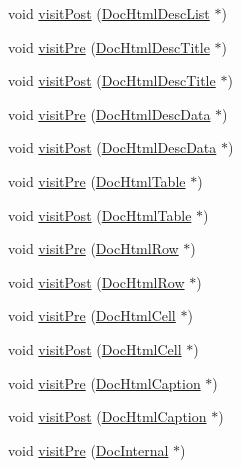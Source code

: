 \begin{DoxyCompactItemize}
\item 
void \hyperlink{class_xml_doc_visitor_acdf145f78058669a7ebdec4b01f5a3d0}{visit\+Post} (\hyperlink{class_doc_html_desc_list}{Doc\+Html\+Desc\+List} $\ast$)
\item 
void \hyperlink{class_xml_doc_visitor_a595c765933227f368988c5b9d9f6caa7}{visit\+Pre} (\hyperlink{class_doc_html_desc_title}{Doc\+Html\+Desc\+Title} $\ast$)
\item 
void \hyperlink{class_xml_doc_visitor_a33e32bde11589abc241522d12605af5d}{visit\+Post} (\hyperlink{class_doc_html_desc_title}{Doc\+Html\+Desc\+Title} $\ast$)
\item 
void \hyperlink{class_xml_doc_visitor_a51bdbe9443903f614f43db7cea6ae737}{visit\+Pre} (\hyperlink{class_doc_html_desc_data}{Doc\+Html\+Desc\+Data} $\ast$)
\item 
void \hyperlink{class_xml_doc_visitor_ae3904008477fa52dff88b6063ff7ef9d}{visit\+Post} (\hyperlink{class_doc_html_desc_data}{Doc\+Html\+Desc\+Data} $\ast$)
\item 
void \hyperlink{class_xml_doc_visitor_aacaefe48d58c04878f7f5463a13f4520}{visit\+Pre} (\hyperlink{class_doc_html_table}{Doc\+Html\+Table} $\ast$)
\item 
void \hyperlink{class_xml_doc_visitor_ac2472360859ba9d911613e7951531060}{visit\+Post} (\hyperlink{class_doc_html_table}{Doc\+Html\+Table} $\ast$)
\item 
void \hyperlink{class_xml_doc_visitor_af1e6260991f61739566f50453e8fa9fd}{visit\+Pre} (\hyperlink{class_doc_html_row}{Doc\+Html\+Row} $\ast$)
\item 
void \hyperlink{class_xml_doc_visitor_a3c2467eba5ee902d4b092168e4887067}{visit\+Post} (\hyperlink{class_doc_html_row}{Doc\+Html\+Row} $\ast$)
\item 
void \hyperlink{class_xml_doc_visitor_ae38f08d399bf68e69f274debcf88c0cd}{visit\+Pre} (\hyperlink{class_doc_html_cell}{Doc\+Html\+Cell} $\ast$)
\item 
void \hyperlink{class_xml_doc_visitor_a5bbdea434f2d4a2c24b27c433d1afea3}{visit\+Post} (\hyperlink{class_doc_html_cell}{Doc\+Html\+Cell} $\ast$)
\item 
void \hyperlink{class_xml_doc_visitor_a31bd42ddaac4b60eb79a1e5e47cb9801}{visit\+Pre} (\hyperlink{class_doc_html_caption}{Doc\+Html\+Caption} $\ast$)
\item 
void \hyperlink{class_xml_doc_visitor_ab5aad7c55a6253e9e606627f4dca1826}{visit\+Post} (\hyperlink{class_doc_html_caption}{Doc\+Html\+Caption} $\ast$)
\item 
void \hyperlink{class_xml_doc_visitor_a687c6f3e4b93ae16c79c5274f8658caa}{visit\+Pre} (\hyperlink{class_doc_internal}{Doc\+Internal} $\ast$)

\end{DoxyCompactItemize}
